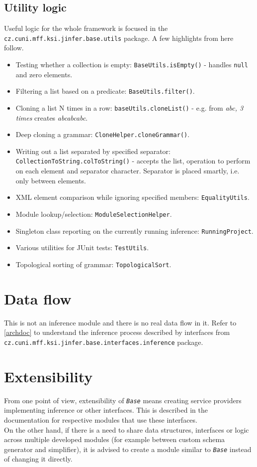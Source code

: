 \documentclass[a4paper,10pt,oneside]{article}
\newcommand{\code}[1]{\texttt{#1}}
\newcommand{\jmodule}[1]{\texttt{\textit{#1}}}
\begin{document}
\subsection{Utility logic}

Useful logic for the whole framework is focused in the \code{cz.cuni.mff.ksi.jinfer.base.utils} package. A few highlights from here follow.
\begin{itemize}
	\item Testing whether a collection is empty: \code{BaseUtils.isEmpty()} - handles \code{null} and zero elements.
	\item Filtering a list based on a predicate: \code{BaseUtils.filter()}.
	\item Cloning a list N times in a row: \code{baseUtils.cloneList()} - e.g. from \emph{abc, 3 times} creates \emph{abcabcabc}.
	\item Deep cloning a grammar: \code{CloneHelper.cloneGrammar()}.
	\item Writing out a list separated by specified separator: \code{CollectionToString.colToString()} - accepts the list, operation to perform on each element and separator character. Separator is placed smartly, i.e. only between elements.
	\item XML element comparison while ignoring specified members: \code{EqualityUtils}.
	\item Module lookup/selection: \code{ModuleSelectionHelper}.
	\item Singleton class reporting on the currently running inference: \code{RunningProject}.
	\item Various utilities for JUnit tests: \code{TestUtils}.
	\item Topological sorting of grammar: \code{TopologicalSort}. 
\end{itemize}

\section{Data flow}

This is not an inference module and there is no real data flow in it. Refer to \ref{archdoc} to understand the inference process described by interfaces from \code{cz.cuni.mff.ksi.jinfer.base.interfaces.inference} package.

\section{Extensibility}

From one point of view, extensibility of \jmodule{Base} means creating service providers implementing inference or other interfaces. This is described in the documentation for respective modules that use these interfaces.\\
On the other hand, if there is a need to share data structures, interfaces or logic across multiple developed modules (for example between custom schema generator and simplifier), it is advised to create a module similar to \jmodule{Base} instead of changing it directly.

\newpage


\end{document}
